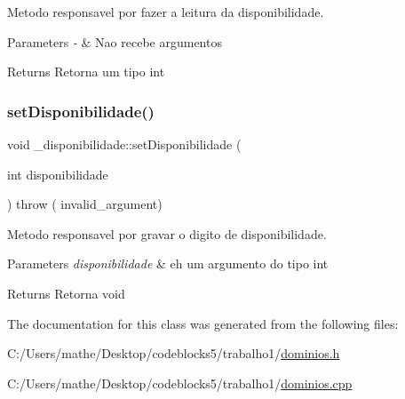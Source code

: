 Metodo responsavel por fazer a leitura da disponibilidade. 


\begin{DoxyParams}{Parameters}
{\em -\/} & Nao recebe argumentos \\
\hline
\end{DoxyParams}
\begin{DoxyReturn}{Returns}
Retorna um tipo int 
\end{DoxyReturn}
\mbox{\label{class__disponibilidade_ab56b496547b580ec59855c80bd630bbf}} 
\subsubsection{\texorpdfstring{setDisponibilidade()}{setDisponibilidade()}}
{\footnotesize\ttfamily void \+\_\+disponibilidade\+::set\+Disponibilidade (\begin{DoxyParamCaption}\item[{int}]{disponibilidade }\end{DoxyParamCaption}) throw ( invalid\+\_\+argument) }



Metodo responsavel por gravar o digito de disponibilidade. 


\begin{DoxyParams}{Parameters}
{\em disponibilidade} & eh um argumento do tipo int \\
\hline
\end{DoxyParams}
\begin{DoxyReturn}{Returns}
Retorna void 
\end{DoxyReturn}


The documentation for this class was generated from the following files\+:\begin{DoxyCompactItemize}
\item 
C\+:/\+Users/mathe/\+Desktop/codeblocks5/trabalho1/\mbox{\hyperlink{dominios_8h}{dominios.\+h}}\item 
C\+:/\+Users/mathe/\+Desktop/codeblocks5/trabalho1/\mbox{\hyperlink{dominios_8cpp}{dominios.\+cpp}}\end{DoxyCompactItemize}
